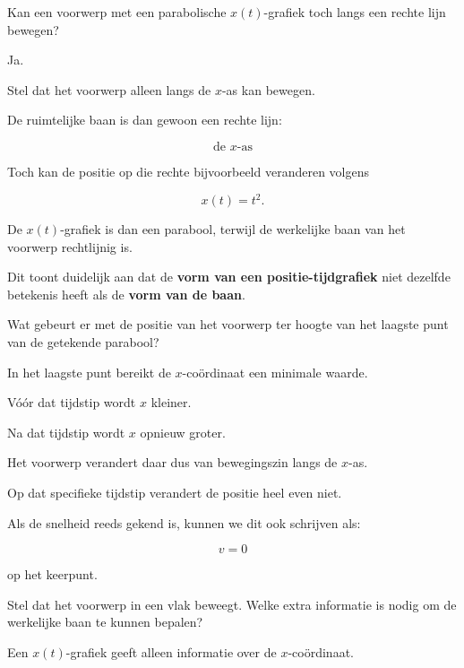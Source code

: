 \documentclass{ximera}
\begin{document}
\begin{oefening}{\oefU\ESS}
  
  \begin{question}
  Kan een voorwerp met een parabolische $x(t)$-grafiek toch langs een rechte
  lijn bewegen?
  
  \begin{oplossing}
  Ja.
  
  Stel dat het voorwerp alleen langs de $x$-as kan bewegen.
  
  De ruimtelijke baan is dan gewoon een rechte lijn:
  
  \[
  \boxed{\text{de }x\text{-as}}
  \]
  
  Toch kan de positie op die rechte bijvoorbeeld veranderen volgens
  
  \[
  x(t)=t^2.
  \]
  
  De $x(t)$-grafiek is dan een parabool, terwijl de werkelijke baan van het
  voorwerp rechtlijnig is.
  
  Dit toont duidelijk aan dat de \textbf{vorm van een positie-tijdgrafiek}
  niet dezelfde betekenis heeft als de \textbf{vorm van de baan}.
  \end{oplossing}
  \end{question}
  
  
  \begin{question}
  Wat gebeurt er met de positie van het voorwerp ter hoogte van het laagste
  punt van de getekende parabool?
  
  \begin{oplossing}
  In het laagste punt bereikt de $x$-coördinaat een minimale waarde.
  
  Vóór dat tijdstip wordt $x$ kleiner.
  
  Na dat tijdstip wordt $x$ opnieuw groter.
  
  Het voorwerp verandert daar dus van bewegingszin langs de $x$-as.
  
  Op dat specifieke tijdstip verandert de positie heel even niet.
  
  Als de snelheid reeds gekend is, kunnen we dit ook schrijven als:
  
  \[
  v=0
  \]
  
  op het keerpunt.
  \end{oplossing}
  \end{question}
  
  
  \begin{question}
  Stel dat het voorwerp in een vlak beweegt. Welke extra informatie is nodig
  om de werkelijke baan te kunnen bepalen?
  
  \begin{oplossing}
  Een $x(t)$-grafiek geeft alleen informatie over de $x$-coördinaat.
  

\end{oplossing}
\end{question}
\end{oefening}
\end{document}

